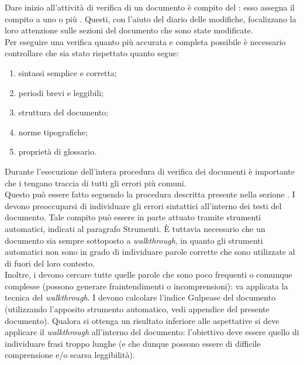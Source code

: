 					Dare inizio all'attività di verifica di un documento è compito del : esso assegna il compito a uno o più . Questi, con l'aiuto del diario delle modifiche, focalizzano la loro attenzione sulle sezioni del documento che sono state modificate.\\
Per eseguire una verifica quanto più accurata e completa possibile è necessario controllare che sia stato rispettato quanto segue:
					\begin{enumerate}
						\item sintassi semplice e corretta;
						\item periodi brevi e leggibili;
						\item struttura del documento;
						\item norme tipografiche;
						\item proprietà di glossario.
					\end{enumerate}
					Durante l'esecuzione dell'intera procedura di verifica dei documenti è importante che i  tengano traccia di tutti gli errori più comuni.\\ Questo può essere fatto seguendo la procedura descritta presente nella sezione .
						I  devono preoccuparsi di individuare gli errori sintattici all'interno dei testi del documento. Tale compito può essere in parte attuato tramite strumenti automatici, indicati al paragrafo Strumenti. È tuttavia necessario che un documento sia sempre sottoposto a \textit{walkthrough}, in quanto gli strumenti automatici non sono in grado di individuare parole corrette che sono utilizzate al di fuori del loro contesto.\\ Inoltre, i  devono cercare tutte quelle parole che sono poco frequenti o comunque complesse (possono generare fraintendimenti o incomprensioni): va applicata la tecnica del \textit{walkthrough}.
						I  devono calcolare l'indice Gulpease del documento (utilizzando l'apposito strumento automatico, vedi appendice  del presente documento). Qualora si ottenga un risultato inferiore alle aspettative si deve applicare il \textit{walkthrough} all'interno del documento: l'obiettivo deve essere quello di individuare frasi troppo lunghe (e che dunque possono essere di difficile comprensione e/o scarsa leggibilità).
